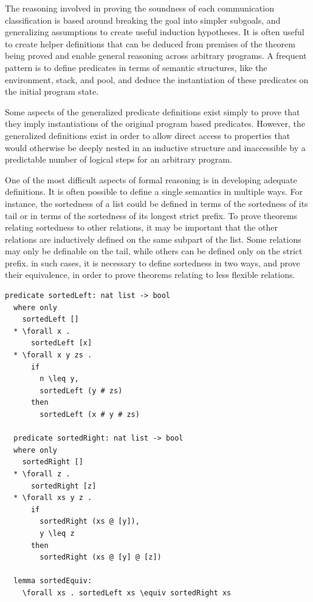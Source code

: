 \documentclass[letterpaper, 11pt]{extarticle}
\begin{document}
The reasoning involved in proving the soundness of each communication classification
is based around breaking the goal into simpler subgoals, and generalizing assumptions to create
useful induction hypotheses.  It is often useful to
create helper definitions that can be deduced
from premises of the theorem being proved and enable
general reasoning across arbitrary programs.
A frequent pattern is to define
predicates in terms of semantic structures, like the environment, stack, and pool, and deduce 
the instantiation of these predicates on the initial program state. 

Some aspects of the generalized predicate definitions exist simply to prove that they imply
instantiations of the original program based predicates. However, the generalized
definitions exist in order to allow direct access to properties that would
otherwise be deeply nested
in an inductive structure and inaccessible by a predictable number of
logical steps for an arbitrary
program.

One of the most difficult aspects of formal reasoning is in developing adequate definitions.
It is often possible to define a single semantics in multiple ways.
For instance, the sortedness of a list could be defined in terms of the sortedness of its tail
or in terms of the sortedness of its longest strict prefix. To prove theorems relating
sortedness to other relations, it may be important that the other relations are inductively
defined on the same subpart of the list. Some relations may only be definable on the tail,
while others can be defined only on the strict prefix. in such cases, it is necessary to
define sortedness in two ways, and prove their equivalence, in order to prove theorems relating
to less flexible relations.

\begin{lstlisting}[language=logic, mathescape]
  predicate sortedLeft: nat list -> bool
  where only
    sortedLeft []
  * \forall x .
      sortedLeft [x]
  * \forall x y zs .
      if 
        n \leq y,
        sortedLeft (y # zs)
      then
        sortedLeft (x # y # zs)

  predicate sortedRight: nat list -> bool
  where only
    sortedRight []
  * \forall z .
      sortedRight [z]
  * \forall xs y z .
      if 
        sortedRight (xs @ [y]),
        y \leq z 
      then
        sortedRight (xs @ [y] @ [z])

  lemma sortedEquiv:
    \forall xs . sortedLeft xs \equiv sortedRight xs  
\end{lstlisting}
\end{document}
